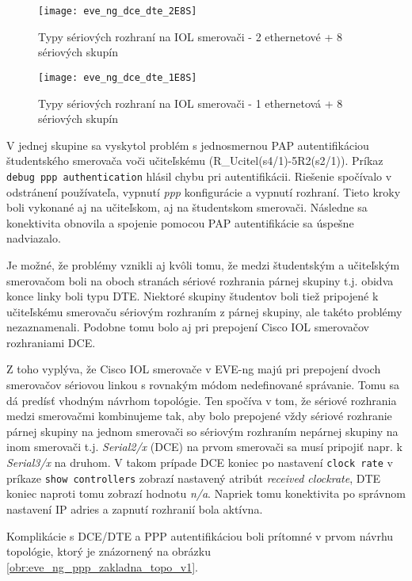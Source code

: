 \begin{figure}
    \centering
    \texttt{[image: eve\_ng\_dce\_dte\_2E8S]}
    \caption{Typy sériových rozhraní na IOL smerovači - 2 ethernetové + 8 sériových skupín}
    \label{obr:eve_ng_dce_dte_2E8S}
\end{figure}

\begin{figure}
    \centering
    \texttt{[image: eve\_ng\_dce\_dte\_1E8S]}
    \caption{Typy sériových rozhraní na IOL smerovači - 1 ethernetová + 8 sériových skupín}
    \label{obr:eve_ng_dce_dte_1E8S}
\end{figure}

V jednej skupine sa vyskytol problém s jednosmernou PAP autentifikáciou študentského smerovača voči učiteľskému (R\_Ucitel(s4/1)-5R2(s2/1)). Príkaz \texttt{debug ppp authentication} hlásil chybu pri autentifikácii. Riešenie spočívalo v odstránení používateľa, vypnutí \emph{ppp} konfigurácie a vypnutí rozhraní. Tieto kroky boli vykonané aj na učiteľskom, aj na študentskom smerovači. Následne sa konektivita obnovila a spojenie pomocou PAP autentifikácie sa úspešne nadviazalo.

Je možné, že problémy vznikli aj kvôli tomu, že medzi študentským a učiteľským smerovačom boli na oboch stranách sériové rozhrania párnej skupiny t.j. obidva konce linky boli typu DTE. Niektoré skupiny študentov boli tiež pripojené k učiteľskému smerovaču sériovým rozhraním z párnej skupiny, ale takéto problémy nezaznamenali. Podobne tomu bolo aj pri prepojení Cisco IOL smerovačov rozhraniami DCE.

Z toho vyplýva, že Cisco IOL smerovače v EVE-ng majú pri prepojení dvoch smerovačov sériovou linkou s rovnakým módom nedefinované správanie. Tomu sa dá predísť vhodným návrhom topológie. Ten spočíva v tom, že sériové rozhrania medzi smerovačmi kombinujeme tak, aby bolo prepojené vždy sériové rozhranie párnej skupiny na jednom smerovači so sériovým rozhraním nepárnej skupiny na inom smerovači t.j. \emph{Serial2/x} (DCE) na prvom smerovači sa musí pripojiť napr. k \emph{Serial3/x} na druhom. V takom prípade DCE koniec po nastavení \texttt{clock rate} v príkaze \texttt{show controllers} zobrazí nastavený atribút \emph{received clockrate}, DTE koniec naproti tomu zobrazí hodnotu \emph{n/a}. Napriek tomu konektivita po správnom nastavení IP adries a zapnutí rozhranií bola aktívna.

Komplikácie s DCE/DTE a PPP autentifikáciou boli prítomné v prvom návrhu topológie, ktorý je znázornený na obrázku \ref{obr:eve_ng_ppp_zakladna_topo_v1}.

